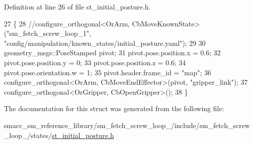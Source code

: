 Definition at line 26 of file st\+\_\+initial\+\_\+posture.\+h.


\begin{DoxyCode}
27         \{
28             \textcolor{comment}{//configure\_orthogonal<OrArm, CbMoveKnownState>("sm\_fetch\_screw\_loop\_1",
       "config/manipulation/known\_states/initial\_posture.yaml");}
29 
30             geometry\_msgs::PoseStamped pivot;
31             pivot.pose.position.x = 0.6;
32             pivot.pose.position.y = 0;
33             pivot.pose.position.z = 0.6;
34             pivot.pose.orientation.w = 1;
35             pivot.header.frame\_id = \textcolor{stringliteral}{"map"};
36             configure\_orthogonal<OrArm, CbMoveEndEffector>(pivot, \textcolor{stringliteral}{"gripper\_link"});
37             configure\_orthogonal<OrGripper, CbOpenGripper>();
38         \}
\end{DoxyCode}


The documentation for this struct was generated from the following file\+:\begin{DoxyCompactItemize}
\item 
smacc\+\_\+sm\+\_\+reference\+\_\+library/sm\+\_\+fetch\+\_\+screw\+\_\+loop\+\_/include/sm\+\_\+fetch\+\_\+screw\+\_\+loop\+\_/states/\hyperlink{sm__fetch__screw__loop__1_2include_2sm__fetch__screw__loop__1_2states_2st__initial__posture_8h}{st\+\_\+initial\+\_\+posture.\+h}\end{DoxyCompactItemize}
